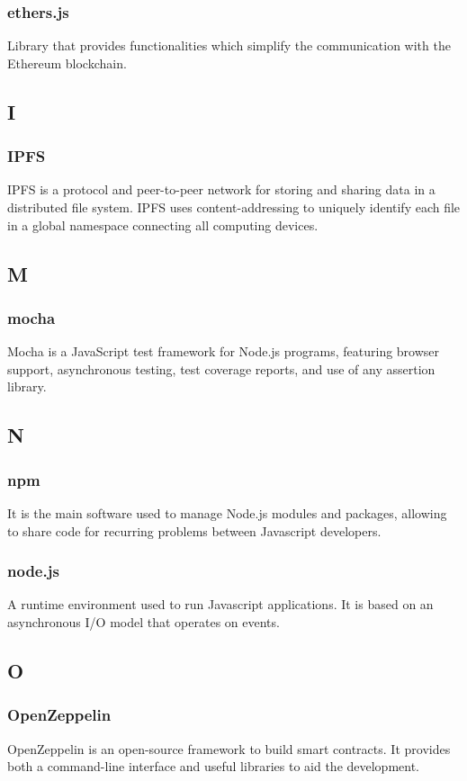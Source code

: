 		\subsubsection*{ethers.js}
			Library that provides functionalities which simplify the communication with the Ethereum blockchain.
	
	\subsection{I}
		\subsubsection*{IPFS}
			IPFS is a protocol and peer-to-peer network for storing and sharing data in a distributed file system. IPFS uses content-addressing to uniquely identify each file in a global namespace connecting all computing devices. 
		
	\subsection{M}
		\subsubsection*{mocha}
			Mocha is a JavaScript test framework for Node.js programs, featuring browser support, asynchronous testing, test coverage reports, and use of any assertion library.
	
	\subsection{N}
		\subsubsection*{npm}
			It is the main software used to manage Node.js modules and packages, allowing to share code for recurring problems between Javascript developers.
		\subsubsection*{node.js}
			A runtime environment used to run Javascript applications. It is based on an asynchronous I/O model that operates on events.
	
	\subsection{O}
	\subsubsection*{OpenZeppelin}
		OpenZeppelin is an open-source framework to build smart contracts. It provides both a command-line interface and useful libraries to aid the development.
	
